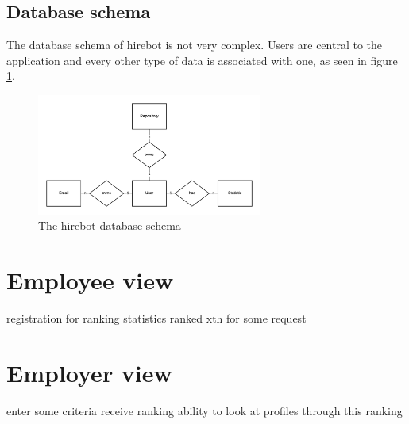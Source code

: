 \subsection{Database schema}
The database schema of hirebot is not very complex.
Users are central to the application and every other type of data
is associated with one, as seen in figure \ref{fig:schema}.

\begin{figure}
  \centering
  \includegraphics[width=20em]{gfx/schema.png}
  \caption{The hirebot database schema}
  \label{fig:schema}
\end{figure}

\section{Employee view}
registration for ranking
statistics
ranked xth for some request

\section{Employer view}
enter some criteria
receive ranking
ability to look at profiles through this ranking
